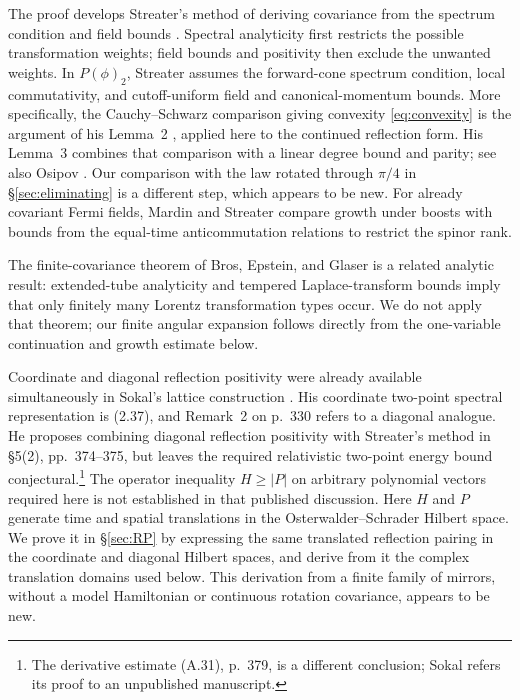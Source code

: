 \documentclass[11pt, letterpaper, reqno]{amsart}
\theoremstyle{definition}
\theoremstyle{remark}
\begin{document}
The proof develops Streater's method of deriving covariance from
the spectrum condition and field bounds
\cite[Theorem, p.~119]{Streater}. Spectral analyticity first restricts
the possible transformation weights; field bounds and positivity then
exclude the unwanted weights. In $P(\phi)_2$, Streater assumes the
forward-cone spectrum condition, local commutativity, and cutoff-uniform
field and canonical-momentum bounds. More specifically,
the Cauchy--Schwarz comparison giving convexity
\eqref{eq:convexity} is the argument of his Lemma~2
\cite[pp.~113--114]{Streater}, applied here to the continued reflection
form. His Lemma~3 \cite[p.~114]{Streater} combines that comparison
with a linear degree bound and parity; see also Osipov
\cite[p.~115]{O}. Our comparison with the law rotated through $\pi/4$
in \S\ref{sec:eliminating} is a different step, which appears to be new.
For already covariant Fermi fields, Mardin and Streater
\cite[(4)--(6), pp.~82--83]{MardinStreater} compare growth under boosts
with bounds from the equal-time anticommutation relations to restrict
the spinor rank.

The finite-covariance theorem of Bros, Epstein, and Glaser
\cite[Theorem~1]{BEG} is a related analytic result: extended-tube
analyticity and tempered Laplace-transform bounds imply that only
finitely many Lorentz transformation types occur. We do not apply
that theorem; our finite angular expansion follows directly from the
one-variable continuation and growth estimate below.

Coordinate and diagonal reflection positivity were already available
simultaneously in Sokal's lattice construction
\cite[pp.~328--330]{Sokal}. His coordinate two-point spectral
representation is (2.37), and Remark~2 on p.~330 refers to a diagonal
analogue. He proposes combining diagonal reflection positivity with
Streater's method in \S5(2), pp.~374--375, but leaves the required
relativistic two-point energy bound conjectural.\footnote{The derivative
estimate (A.31), p.~379, is a different conclusion; Sokal refers its
proof to an unpublished manuscript.}
The operator inequality $H\geq|P|$ on arbitrary polynomial vectors
required here is not established in that published discussion. Here
$H$ and $P$ generate time and spatial translations in the
Osterwalder--Schrader Hilbert space. We prove it in \S\ref{sec:RP} by
expressing the same translated reflection pairing in the coordinate
and diagonal Hilbert spaces, and derive from it the complex translation
domains used below. This derivation from a finite family of mirrors,
without a model Hamiltonian or continuous rotation covariance, appears
to be new.
\end{document}
